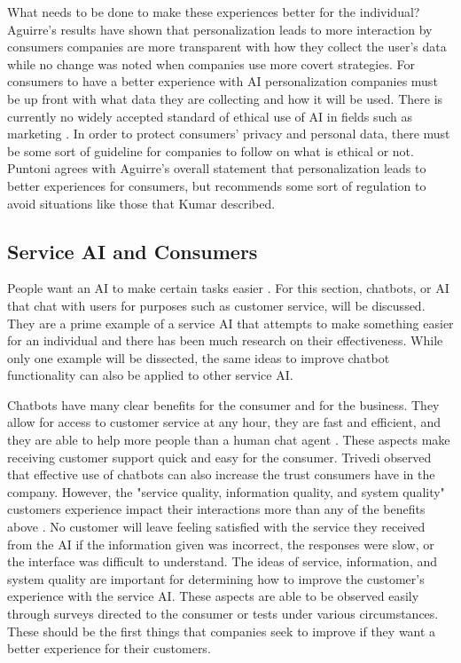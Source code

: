 \documentclass[12pt, man]{apa6}
\begin{document}
What needs to be done to make these experiences better for the individual?  Aguirre's \parencite*{Aguirre2015} results have shown that personalization leads to more interaction by consumers companies are more transparent with how they collect the user's data while no change was noted when companies use more covert strategies.  For consumers to have a better experience with AI personalization companies must be up front with what data they are collecting and how it will be used.  There is currently no widely accepted standard of ethical use of AI in fields such as marketing \parencite{Puntoni2021}.  In order to protect consumers' privacy and personal data, there must be some sort of guideline for companies to follow on what is ethical or not.  Puntoni agrees with Aguirre's overall statement that personalization leads to better experiences for consumers, but recommends some sort of regulation to avoid situations like those that Kumar described.

\subsection*{Service AI and Consumers}
People want an AI to make certain tasks easier \parencite{Trivedi201991}.  For this section, chatbots, or AI that chat with users for purposes such as customer service, will be discussed.  They are a prime example of a service AI that attempts to make something easier for an individual and there has been much research on their effectiveness.  While only one example will be dissected, the same ideas to improve chatbot functionality can also be applied to other service AI.

Chatbots have many clear benefits for the consumer and for the business.  They allow for access to customer service at any hour, they are fast and efficient, and they are able to help more people than a human chat agent \parencite{McLean2017494}. These aspects make receiving customer support quick and easy for the consumer.  Trivedi \parencite*{Trivedi201991} observed that effective use of chatbots can also increase the trust consumers have in the company.  However, the "service quality, information quality, and system quality" customers experience impact their interactions more than any of the benefits above \parencite{McLean2017494}.  No customer will leave feeling satisfied with the service they received from the AI if the information given was incorrect, the responses were slow, or the interface was difficult to understand.  The ideas of service, information, and system quality are important for determining how to improve the customer's experience with the service AI.  These aspects are able to be observed easily through surveys directed to the consumer or tests under various circumstances.  These should be the first things that companies seek to improve if they want a better experience for their customers.
\end{document}
